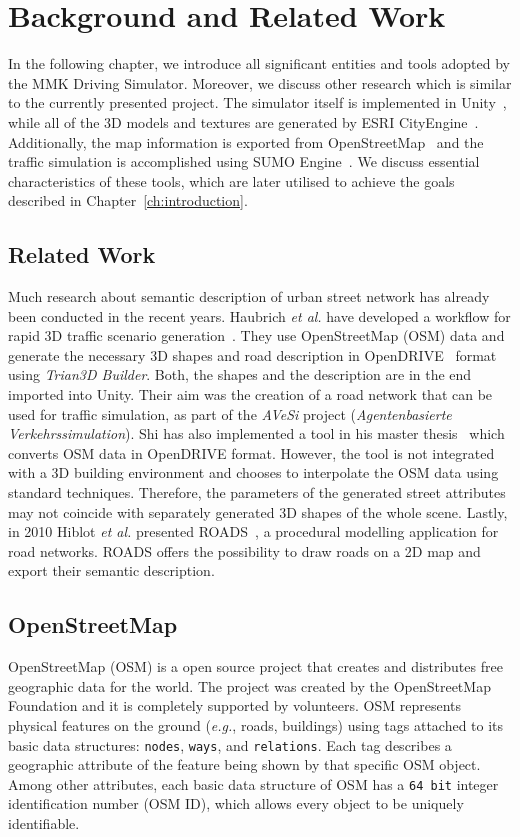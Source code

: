 \chapter{Background and Related Work}
\label{ch:background}
In the following chapter, we introduce all significant entities and tools adopted by the MMK Driving Simulator. Moreover, we discuss other research which is similar to the currently presented project. The simulator itself is implemented in Unity~\cite{unity}, while all of the 3D models and textures are generated by ESRI CityEngine~\cite{ce}. Additionally, the map information is exported from OpenStreetMap~\cite{osm} and the traffic simulation is accomplished using SUMO Engine~\cite{sumo}. We discuss essential characteristics of these tools, which are later utilised to achieve the goals described in Chapter~\ref{ch:introduction}. 

\section{Related Work}
Much research about semantic description of urban street network has already been conducted in the recent years. Haubrich \emph{et al.} have developed a workflow for rapid 3D traffic scenario generation~\cite{haubrich2013semantic}. They use OpenStreetMap (OSM) data and generate the necessary 3D shapes and road description in OpenDRIVE~\cite{dupuis2010opendrive} format using \emph{Trian3D Builder}. Both, the shapes and the description are in the end imported into Unity. Their aim was the creation of a road network that can be used for traffic simulation, as part of the \emph{AVeSi} project (\emph{Agentenbasierte Verkehrssimulation}). Shi has also implemented a tool in his master thesis~\cite{shi2011automatic} which converts OSM data in OpenDRIVE format. However, the tool is not integrated with a 3D building environment and chooses to interpolate the OSM data using standard techniques. Therefore, the parameters of the generated street attributes may not coincide with separately generated 3D shapes of the whole scene. Lastly, in 2010 Hiblot \emph{et al.} presented ROADS~\cite{hiblot2010pro}, a procedural modelling application for road networks. ROADS offers the possibility to draw roads on a 2D map and export their semantic description.  

\section{OpenStreetMap}
\label{ch:osm}
OpenStreetMap (OSM) is a open source project that creates and distributes free geographic data for the world. The project was created by the OpenStreetMap Foundation and it is completely supported by volunteers. OSM represents physical features on the ground (\emph{e.g.}, roads, buildings) using tags attached to its basic data structures: \texttt{nodes}, \texttt{ways}, and \texttt{relations}. Each tag describes a geographic attribute of the feature being shown by that specific OSM object. Among other attributes, each basic data structure of OSM has a \texttt{64 bit} integer identification number (OSM ID), which allows every object to be uniquely identifiable.

